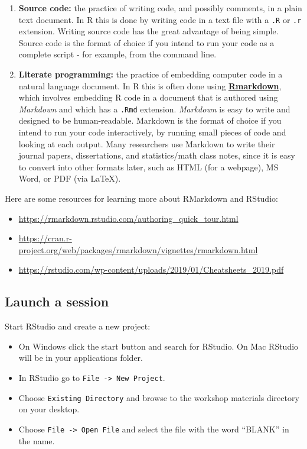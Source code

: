 \documentclass[
]{book}
\providecommand{\tightlist}{%
  \setlength{\itemsep}{0pt}\setlength{\parskip}{0pt}}
\begin{document}
\begin{enumerate}
\def\labelenumi{\arabic{enumi}.}
\item
  \textbf{Source code:} the practice of writing code, and possibly comments, in a plain text document. In R this is done by writing code in a text file with a \texttt{.R} or \texttt{.r} extension. Writing source code has the great advantage of being simple. Source code is the format of choice if you intend to run your code as a complete script - for example, from the command line.
\item
  \textbf{Literate programming:} the practice of embedding computer code in a natural language document. In R this is often done using \href{https://rmarkdown.rstudio.com/}{\textbf{Rmarkdown}}, which involves embedding R code in a document that is authored using \emph{Markdown} and which has a \texttt{.Rmd} extension. \emph{Markdown} is easy to write and designed to be human-readable. Markdown is the format of choice if you intend to run your code interactively, by running small pieces of code and looking at each output. Many researchers use Markdown to write their journal papers, dissertations, and statistics/math class notes, since it is easy to convert into other formats later, such as HTML (for a webpage), MS Word, or PDF (via LaTeX).
\end{enumerate}

Here are some resources for learning more about RMarkdown and RStudio:

\begin{itemize}
\tightlist
\item
  \url{https://rmarkdown.rstudio.com/authoring_quick_tour.html}
\item
  \url{https://cran.r-project.org/web/packages/rmarkdown/vignettes/rmarkdown.html}
\item
  \url{https://rstudio.com/wp-content/uploads/2019/01/Cheatsheets_2019.pdf}
\end{itemize}

\hypertarget{launch-a-session}{%
\subsection{Launch a session}\label{launch-a-session}}

Start RStudio and create a new project:

\begin{itemize}
\tightlist
\item
  On Windows click the start button and search for RStudio. On Mac
  RStudio will be in your applications folder.
\item
  In RStudio go to \texttt{File\ -\textgreater{}\ New\ Project}.
\item
  Choose \texttt{Existing\ Directory} and browse to the workshop materials directory on your desktop.
\item
  Choose \texttt{File\ -\textgreater{}\ Open\ File} and select the file with the word ``BLANK'' in the name.
\end{itemize}
\end{document}
